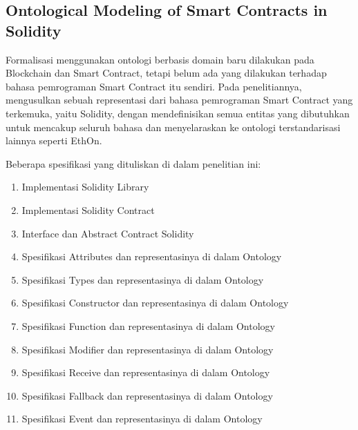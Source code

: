 \subsection{Ontological Modeling of Smart Contracts in Solidity}
\label{subsec:solidity-ontology}

Formalisasi menggunakan ontologi berbasis domain baru dilakukan pada Blockchain dan Smart Contract, tetapi belum ada yang dilakukan terhadap bahasa pemrograman Smart Contract itu sendiri. Pada penelitiannya, \cite{cano2021toward} mengusulkan sebuah representasi dari bahasa pemrograman Smart Contract yang terkemuka, yaitu Solidity, dengan mendefinisikan semua entitas yang dibutuhkan untuk mencakup seluruh bahasa dan menyelaraskan ke ontologi terstandarisasi lainnya seperti EthOn.

Beberapa spesifikasi yang dituliskan di dalam penelitian ini:

\begin{enumerate}
  \item Implementasi Solidity Library
  \item Implementasi Solidity Contract
  \item Interface dan Abstract Contract Solidity
  \item Spesifikasi Attributes dan representasinya di dalam Ontology 
  \item Spesifikasi Types dan representasinya di dalam Ontology
  \item Spesifikasi Constructor dan representasinya di dalam Ontology
  \item Spesifikasi Function dan representasinya di dalam Ontology
  \item Spesifikasi Modifier dan representasinya di dalam Ontology
  \item Spesifikasi Receive dan representasinya di dalam Ontology
  \item Spesifikasi Fallback dan representasinya di dalam Ontology
  \item Spesifikasi Event dan representasinya di dalam Ontology
\end{enumerate}
